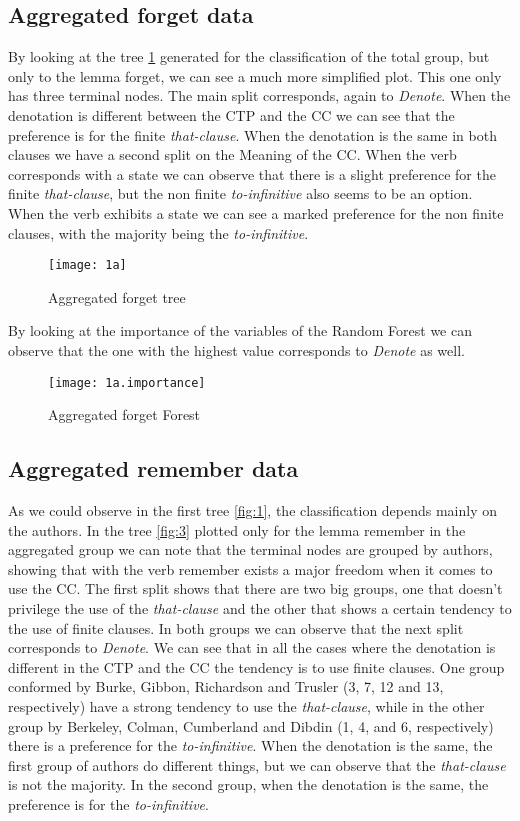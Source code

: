 \documentclass[final]{clv3} %
\begin{document}
\subsection{Aggregated forget data}
By looking at the tree \cref{fig:2} generated for the classification of the total group, but only to the lemma forget, we can see a much more simplified plot. This one only has three terminal nodes. The main split corresponds, again to \textit{Denote}. When the denotation is different between the CTP and the CC we can see that the preference is for the finite \textit{that-clause}. When the denotation is the same in both clauses we have a second split on the Meaning of the CC. When the verb corresponds with a state we can observe that there is a slight preference for the finite \textit{that-clause}, but the non finite \textit{to-infinitive} also seems to be an option. When the verb exhibits a state we can see a marked preference for the non finite clauses, with the majority being the \textit{to-infinitive}.

\begin{figure}[htpb]
    \centering
    \texttt{[image: 1a]}
    \caption{Aggregated forget tree}
    \label{fig:2}
\end{figure}

By looking at the importance of the variables of the Random Forest we can observe that the one with the highest value corresponds to \textit{Denote} as well.

\begin{figure}[htpb]
    \centering
    \texttt{[image: 1a.importance]}
    \caption{Aggregated forget Forest}
    \label{fig:12}
\end{figure}

\subsection{Aggregated remember data}
As we could observe in the first tree \cref{fig:1}, the classification depends mainly on the authors. In the tree \cref{fig:3} plotted only for the lemma remember in the aggregated group we can note that the terminal nodes are grouped by authors, showing that with the verb remember exists a major freedom when it comes to use the CC.
The first split shows that there are two big groups, one that doesn't privilege the use of the \textit{\textit{that-clause}} and the other that shows a certain tendency to the use of finite clauses. In both groups we can observe that the next split corresponds to \textit{\textit{Denote}}. We can see that in all the cases where the denotation is different in the CTP and the CC the tendency is to use finite clauses. One group conformed by Burke, Gibbon, Richardson and Trusler (3, 7, 12 and 13, respectively) have a strong tendency to use the \textit{\textit{that-clause}}, while in the other group by Berkeley, Colman, Cumberland and Dibdin (1, 4,  and 6, respectively) there is a preference for the \textit{\textit{to-infinitive}}.
When the denotation is the same, the first group of authors do different things, but we can observe that the \textit{\textit{that-clause}} is not the majority. In the second group, when the denotation is the same, the preference is for the \textit{\textit{to-infinitive}}.
\end{document}
